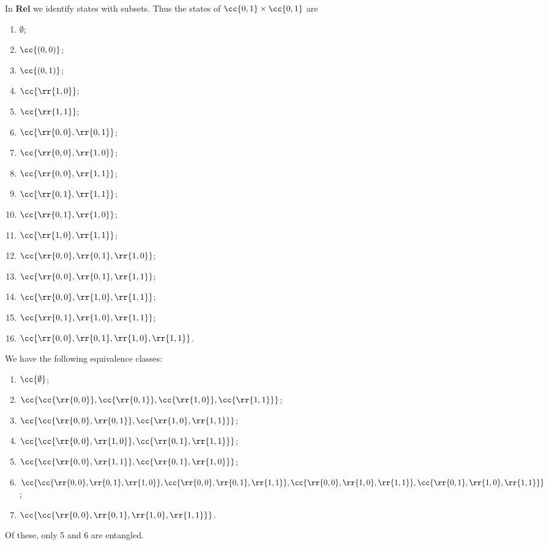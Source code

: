 \documentclass{article}
\begin{document}
\begin{answer*}[c]
  In \textbf{Rel} we identify states with subsets. Thus the states of $\cc{0,1}\times\cc{0,1}$
  are
  \begin{enumerate}
    \item $\emptyset$;
    \item $\cc{(0,0)}$;
    \item $\cc{(0,1)}$;
    \item $\cc{\rr{1,0}}$;
    \item $\cc{\rr{1,1}}$;
    \item $\cc{\rr{0,0},\rr{0,1}}$;
    \item $\cc{\rr{0,0},\rr{1,0}}$;
    \item $\cc{\rr{0,0},\rr{1,1}}$;
    \item $\cc{\rr{0,1},\rr{1,1}}$;
    \item $\cc{\rr{0,1},\rr{1,0}}$;
    \item $\cc{\rr{1,0},\rr{1,1}}$;
    \item $\cc{\rr{0,0},\rr{0,1},\rr{1,0}}$;
    \item $\cc{\rr{0,0},\rr{0,1},\rr{1,1}}$;
    \item $\cc{\rr{0,0},\rr{1,0},\rr{1,1}}$;
    \item $\cc{\rr{0,1},\rr{1,0},\rr{1,1}}$;
    \item $\cc{\rr{0,0},\rr{0,1},\rr{1,0},\rr{1,1}}$.
  \end{enumerate}
\end{answer*}

\begin{answer*}
  We have the following equivalence classes:
  \begin{enumerate}
    \item $\cc{\emptyset}$;
    \item $\cc{\cc{\rr{0,0}},\cc{\rr{0,1}},\cc{\rr{1,0}},\cc{\rr{1,1}}}$;
    \item $\cc{\cc{\rr{0,0},\rr{0,1}},\cc{\rr{1,0},\rr{1,1}}}$;
    \item $\cc{\cc{\rr{0,0},\rr{1,0}},\cc{\rr{0,1},\rr{1,1}}}$;
    \item $\cc{\cc{\rr{0,0},\rr{1,1}},\cc{\rr{0,1},\rr{1,0}}}$;
    \item $\cc{\cc{\rr{0,0},\rr{0,1},\rr{1,0}},
        \cc{\rr{0,0},\rr{0,1},\rr{1,1}},
        \cc{\rr{0,0},\rr{1,0},\rr{1,1}},
      \cc{\rr{0,1},\rr{1,0},\rr{1,1}}}$;
    \item $\cc{\cc{\rr{0,0},\rr{0,1},\rr{1,0},\rr{1,1}}}$.
  \end{enumerate}
  Of these, only 5 and 6 are entangled.
\end{answer*}
\end{document}
